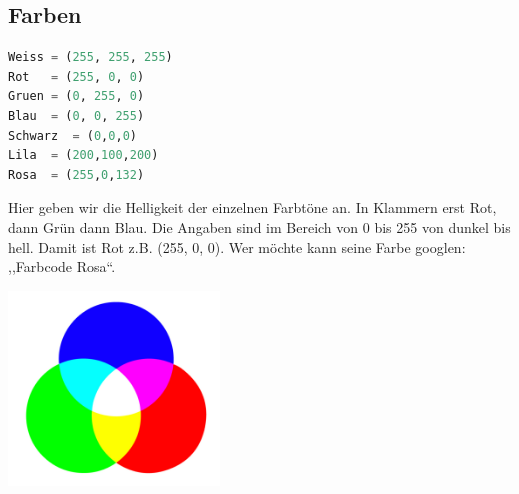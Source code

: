 \subsection{\large{Farben}}
\begin{lstlisting}[language=Python, caption=Farben]
Weiss = (255, 255, 255)
Rot   = (255, 0, 0)
Gruen = (0, 255, 0)
Blau  = (0, 0, 255)
Schwarz  = (0,0,0)
Lila  = (200,100,200)
Rosa  = (255,0,132)
\end{lstlisting}
Hier geben wir die Helligkeit der einzelnen Farbtöne an. In Klammern erst Rot, dann Grün dann Blau. Die Angaben sind im Bereich von 0 bis 255 von dunkel bis hell. Damit ist Rot z.B. (255, 0, 0). Wer möchte kann seine Farbe googlen: ,,Farbcode Rosa``.\\
\begin{minipage}[t]{\textwidth}
  \centering
  \includegraphics[width=0.42\textwidth]{pictures/RGB.png}
  \label{img:RGB}
\end{minipage}

